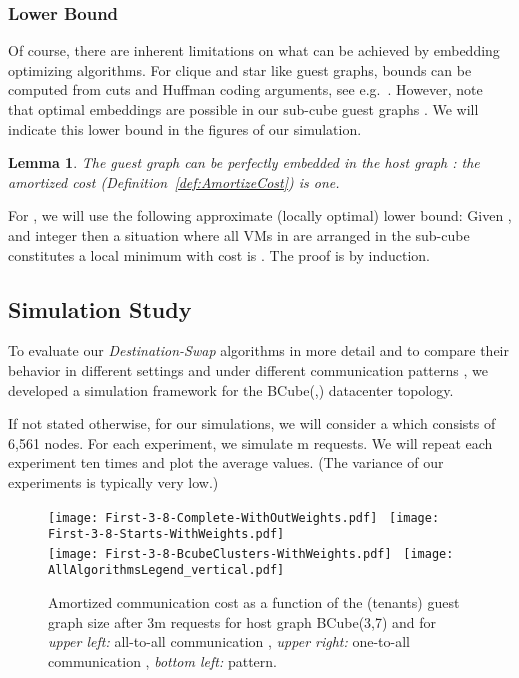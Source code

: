 \documentclass[conference]{IEEEtran}
\newtheorem{lemma}{Lemma}
\def\BC#1#2{BCube(#1,#2)}
\begin{document}
\subsubsection{Lower Bound}

Of course, there are inherent limitations on what can be achieved by embedding optimizing algorithms.
For clique and star like guest graphs, bounds can be computed from cuts and Huffman coding arguments, see e.g.~\cite{ipdps13}.
However, note that optimal embeddings are possible in our sub-cube guest graphs . We will indicate
this lower bound in the figures of our simulation.

\begin{lemma}
 The guest graph  can be perfectly embedded in the host graph : the amortized cost (Definition~\ref{def:AmortizeCost}) is one.
\end{lemma}



For , we will use the following approximate (locally optimal) lower bound:
Given ,  and integer  then a situation where all VMs in  are arranged in the sub-cube 
constitutes a local minimum with cost is . The proof is by induction.





\subsection{Simulation Study}

To evaluate our \emph{Destination-Swap} algorithms in more detail and to compare their behavior in different settings and under
different communication patterns , we developed a simulation framework for the \BC{}{} datacenter topology.


If not stated otherwise, for our simulations, we will
consider a  which consists of 6,561 nodes.
For each experiment, we simulate m requests.
We will repeat each experiment ten times and plot the average
values. (The variance of our experiments is typically very low.)


	\begin{figure}[h]
				\centering
				\texttt{[image: First-3-8-Complete-WithOutWeights.pdf]}~				 \texttt{[image: First-3-8-Starts-WithWeights.pdf]}\\
				\texttt{[image: First-3-8-BcubeClusters-WithWeights.pdf]}~      \texttt{[image: AllAlgorithmsLegend\_vertical.pdf]}
				\caption{Amortized communication cost as a function of the (tenants) guest graph size after 3m requests for host graph \BC{3}{7} and for \emph{upper left:} all-to-all communication ,
\emph{upper right:} one-to-all communication , \emph{bottom left:}  pattern.}
				\label{fig:First-3-8-Complete-WithOutWeights}
				\end{figure}
				
\end{document}
